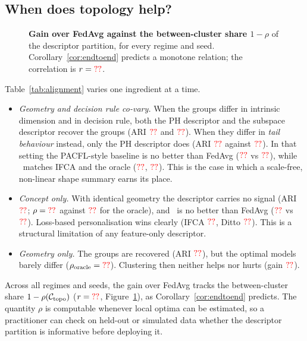\subsection{When does topology help?}
\label{sec:e_alignment}

\begin{table}[t]
\centering\small
\caption{\textbf{Alignment between geometry and decision rules} (synthetic, $K=8$).
The first rows show recovery of the latent groups (ARI) and the within-cluster share
$\rho(\calC)$ of the dispersion of client optima (lower is better). The bottom rows show the
personalised log-loss. $^\diamond$: non-deployable.}
\label{tab:alignment}
\end{table}

\begin{figure}[t]
\centering
{}
\caption{\textbf{Gain over FedAvg against the between-cluster share $1-\rho$} of the
descriptor partition, for every regime and seed. Corollary~\ref{cor:endtoend} predicts a
monotone relation; the correlation is $r=\textcolor{red}{??}$.}
\label{fig:alignment}
\end{figure}

Table~\ref{tab:alignment} varies one ingredient at a time.
\begin{itemize}[leftmargin=1.2em,itemsep=2pt]
  \item \emph{Geometry and decision rule co-vary.} When the groups differ in intrinsic
    dimension and in decision rule, both the PH descriptor and the subspace descriptor
    recover the groups (ARI $\textcolor{red}{??}$ and $\textcolor{red}{??}$). When they differ in
    \emph{tail behaviour} instead, only the PH descriptor does (ARI $\textcolor{red}{??}$ against
    $\textcolor{red}{??}$). In that setting the PACFL-style baseline is no better than FedAvg
    ($\textcolor{red}{??}$ vs $\textcolor{red}{??}$), while \ptopofl\ matches IFCA and the oracle
    ($\textcolor{red}{??}$, $\textcolor{red}{??}$). This is the case in which a scale-free, non-linear
    shape summary earns its place.
  \item \emph{Concept only.} With identical geometry the descriptor carries no signal (ARI
    $\textcolor{red}{??}$; $\rho=\textcolor{red}{??}$ against $\textcolor{red}{??}$ for the oracle), and
    \ptopofl\ is no better than FedAvg ($\textcolor{red}{??}$ vs $\textcolor{red}{??}$). Loss-based
    personalisation wins clearly (IFCA $\textcolor{red}{??}$, Ditto $\textcolor{red}{??}$). This is a
    structural limitation of any feature-only descriptor.
  \item \emph{Geometry only.} The groups are recovered (ARI $\textcolor{red}{??}$), but the optimal
    models barely differ ($\rho_{\mathrm{oracle}}=\textcolor{red}{??}$). Clustering then neither
    helps nor hurts (gain $\textcolor{red}{??}$).
\end{itemize}
Across all regimes and seeds, the gain over FedAvg tracks the between-cluster share
$1-\rho(\mathcal{C}_{\mathrm{topo}})$ ($r=\textcolor{red}{??}$, Figure~\ref{fig:alignment}), as
Corollary~\ref{cor:endtoend} predicts. The quantity $\rho$ is computable whenever local
optima can be estimated, so a practitioner can check on held-out or simulated data whether
the descriptor partition is informative before deploying it.

